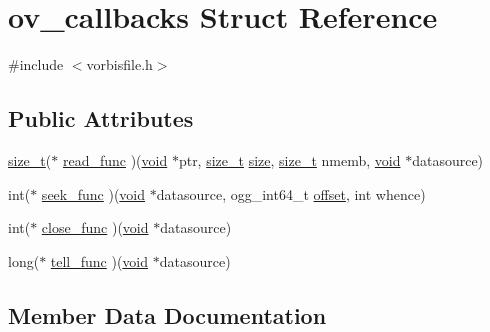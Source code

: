 \hypertarget{structov__callbacks}{}\section{ov\+\_\+callbacks Struct Reference}
\label{structov__callbacks}


{\ttfamily \#include $<$vorbisfile.\+h$>$}

\subsection*{Public Attributes}
\begin{DoxyCompactItemize}
\item 
\hyperlink{_s_d_l__config_8h_a7c94ea6f8948649f8d181ae55911eeaf}{size\+\_\+t}($\ast$ \hyperlink{structov__callbacks_a301b93b9f0436e5bde6dbdeb0edeae77}{read\+\_\+func} )(\hyperlink{_s_d_l__opengles2__gl2ext_8h_ae5d8fa23ad07c48bb609509eae494c95}{void} $\ast$ptr, \hyperlink{_s_d_l__config_8h_a7c94ea6f8948649f8d181ae55911eeaf}{size\+\_\+t} \hyperlink{_s_d_l__opengl__glext_8h_a3d1e3edfcf61ca2d831883e1afbad89e}{size}, \hyperlink{_s_d_l__config_8h_a7c94ea6f8948649f8d181ae55911eeaf}{size\+\_\+t} nmemb, \hyperlink{_s_d_l__opengles2__gl2ext_8h_ae5d8fa23ad07c48bb609509eae494c95}{void} $\ast$datasource)
\item 
int($\ast$ \hyperlink{structov__callbacks_aa49d8079756c1c26e2ba9b974e463dfa}{seek\+\_\+func} )(\hyperlink{_s_d_l__opengles2__gl2ext_8h_ae5d8fa23ad07c48bb609509eae494c95}{void} $\ast$datasource, ogg\+\_\+int64\+\_\+t \hyperlink{_s_d_l__opengl__glext_8h_ac915cd848f42b26af51745f204a3b9af}{offset}, int whence)
\item 
int($\ast$ \hyperlink{structov__callbacks_a4d1141e00251a23b27e1de261e8717ec}{close\+\_\+func} )(\hyperlink{_s_d_l__opengles2__gl2ext_8h_ae5d8fa23ad07c48bb609509eae494c95}{void} $\ast$datasource)
\item 
long($\ast$ \hyperlink{structov__callbacks_ab078f3f386b7c58e9fab2ede904e0e36}{tell\+\_\+func} )(\hyperlink{_s_d_l__opengles2__gl2ext_8h_ae5d8fa23ad07c48bb609509eae494c95}{void} $\ast$datasource)
\end{DoxyCompactItemize}


\subsection{Member Data Documentation}
\mbox{\label{structov__callbacks_a4d1141e00251a23b27e1de261e8717ec}} 
